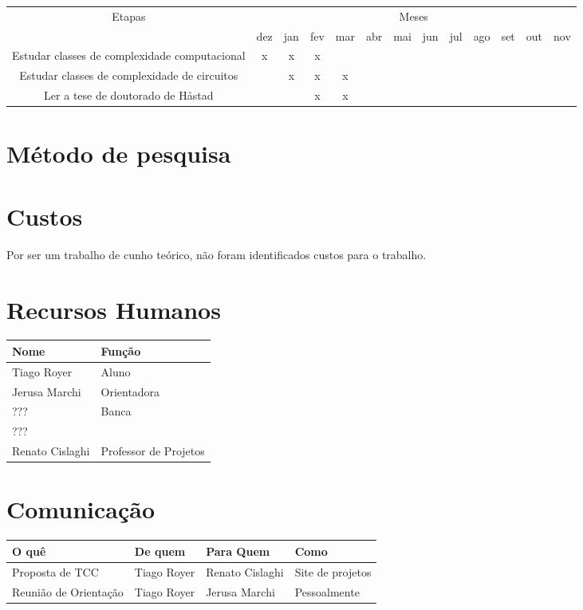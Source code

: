 \documentclass[12pt]{article}
\begin{document}
    \begin{tabular}{|c|c|c|c|c|c|c|c|c|c|c|c|c|}
        \hline
        \multirow{2}{*}{Etapas} & \multicolumn{12}{|c|}{Meses}\\ \cline{2-13}
                        & dez & jan & fev & mar & abr & mai & jun & jul & ago & set & out & nov \\ \hline
        Estudar classes
        de complexidade
        computacional   &  x  &  x  &  x  &     &     &     &     &     &     &     &     &     \\ \hline
        Estudar classes
        de complexidade
        de circuitos    &     &  x  &  x  &  x  &     &     &     &     &     &     &     &     \\ \hline
        Ler a tese de
        doutorado de
        Håstad          &     &     &  x  &  x  &     &     &     &     &     &     &     &     \\ \hline

    \end{tabular}

\section{Método de pesquisa}
    \blindtext[3]

\section{Custos}
    Por ser um trabalho de cunho teórico, não foram identificados custos para o trabalho.

\section{Recursos Humanos}
    \begin{tabular}{l l}
        \hline
        Nome            & Função \\
        \hline
        Tiago Royer     & Aluno \\
        Jerusa Marchi   & Orientadora \\
        ???             & \multirow{2}{*}{Banca} \\
        ???             & \\
        Renato Cislaghi & Professor de Projetos \\
        \hline
    \end{tabular}

\section{Comunicação}
    \begin{tabular}{l l l l}
        \hline
        O quê                   & De quem       & Para Quem         & Como \\
        \hline
        Proposta de TCC         & Tiago Royer   & Renato Cislaghi   & Site de projetos \\
        Reunião de Orientação   & Tiago Royer   & Jerusa Marchi & Pessoalmente \\
        \hline
    \end{tabular}
\end{document}
